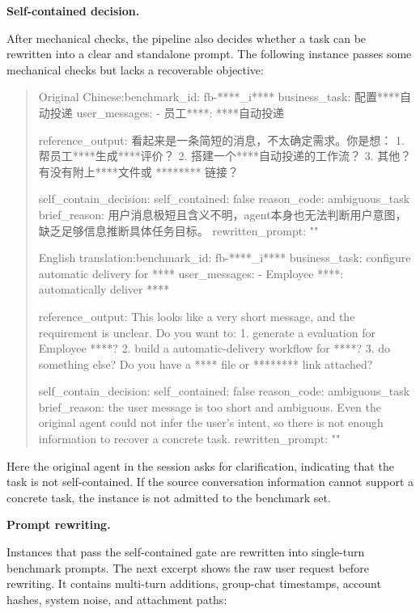\documentclass[11pt, a4paper, copyright, frontis]{frontis}
\newcommand{\caseheader}[1]{\noindent\colorbox{fbcaseblue}{\parbox{0.96\linewidth}{\color{white}\bfseries #1}}\vspace{0.5mm}\newline}
\newenvironment{casebox}{%
  \begin{quote}%
  \setlength{\parindent}{0pt}%
  \setlength{\parskip}{0pt}%
}{%
  \end{quote}%
}
\newenvironment{caselines}{%
  \begingroup
  \parindent0pt
  \parskip0pt
  \obeylines
  \obeyspaces
}{%
  \endgroup
}
\begin{document}
\caseheader{Self-contained decision.}
After mechanical checks, the pipeline also decides whether a task can be rewritten into a clear and standalone prompt. The following instance passes some mechanical checks but lacks a recoverable objective:

\begin{casebox}\scriptsize\raggedright
\begin{caselines}
Original Chinese:\nopagebreak[4]
benchmark\_id: fb-****\_i****
business\_task: 配置****自动投递
user\_messages:
- 员工****: ****自动投递

reference\_output:
看起来是一条简短的消息，不太确定需求。你是想：
1. 帮员工****生成****评价？
2. 搭建一个****自动投递的工作流？
3. 其他？
有没有附上****文件或 ******** 链接？

self\_contain\_decision:
  self\_contained: false
  reason\_code: ambiguous\_task
  brief\_reason: 用户消息极短且含义不明，agent本身也无法判断用户意图，缺乏足够信息推断具体任务目标。
  rewritten\_prompt: ""

English translation:\nopagebreak[4]
benchmark\_id: fb-****\_i****
business\_task: configure automatic delivery for ****
user\_messages:
- Employee ****: automatically deliver ****

reference\_output:
This looks like a very short message, and the requirement is unclear. Do you want to:
1. generate a evaluation for Employee ****?
2. build a automatic-delivery workflow for ****?
3. do something else?
Do you have a **** file or ******** link attached?

self\_contain\_decision:
  self\_contained: false
  reason\_code: ambiguous\_task
  brief\_reason: the user message is too short and ambiguous. Even the original agent could not infer the user's intent, so there is not enough information to recover a concrete task.
  rewritten\_prompt: ""
\end{caselines}
\end{casebox}

Here the original agent in the session asks for clarification, indicating that the task is not self-contained. If the source conversation information cannot support a concrete task, the instance is not admitted to the benchmark set.

\caseheader{Prompt rewriting.}
Instances that pass the self-contained gate are rewritten into single-turn benchmark prompts. The next excerpt shows the raw user request before rewriting. It contains multi-turn additions, group-chat timestamps, account hashes, system noise, and attachment paths:
\end{document}
